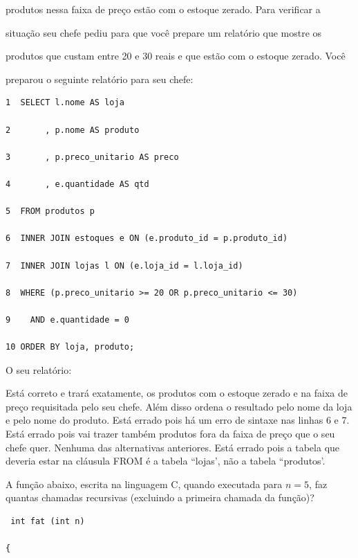 \documentclass[12pt, addpoints]{exam}
\begin{document}
\begin{questions}
produtos nessa faixa de preço estão com o estoque zerado. Para verificar a

situação seu chefe pediu para que você prepare um relatório que mostre os

produtos que custam entre 20 e 30 reais e que estão com o estoque zerado. Você

preparou o seguinte relatório para seu chefe:

\begin{tcolorbox}

 \begin{verbatim}1  SELECT l.nome AS loja

2       , p.nome AS produto

3       , p.preco_unitario AS preco

4       , e.quantidade AS qtd

5  FROM produtos p

6  INNER JOIN estoques e ON (e.produto_id = p.produto_id)

7  INNER JOIN lojas l ON (e.loja_id = l.loja_id)

8  WHERE (p.preco_unitario >= 20 OR p.preco_unitario <= 30)

9    AND e.quantidade = 0

10 ORDER BY loja, produto;

 \end{verbatim}

\end{tcolorbox}

O seu relatório:
\begin{choices}
\choice Está correto e trará exatamente, os produtos com o estoque zerado e na faixa de preço requisitada pelo seu chefe. Além disso ordena o resultado pelo nome da loja e pelo nome do produto.
\choice Está errado pois há um erro de sintaxe nas linhas 6 e 7.
\choice Está errado pois vai trazer também produtos fora da faixa de preço que o seu chefe quer.
\choice Nenhuma das alternativas anteriores.
\choice Está errado pois a tabela que deveria estar na cláusula FROM é a tabela ``lojas', não a tabela ``produtos'.
\end{choices}

\question

A função abaixo, escrita na linguagem C, quando executada para \( n = 5 \), faz quantas chamadas recursivas (excluindo a primeira chamada da função)? 

\begin{verbatim} int fat (int n) 

{ 


\end{verbatim}
\end{questions}
\end{document}
